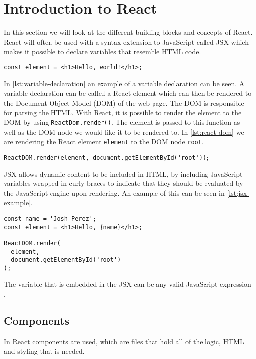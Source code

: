 \section{Introduction to React}\label{sec:intro-to-react}
In this section we will look at the different building blocks and concepts of React.
React will often be used with a syntax extension to JavaScript called JSX \cite{introducingJSX} which makes it possible to declare variables that resemble HTML code.

\begin{lstlisting}[caption={Variable declation in React}, captionpos=b, label={lst:variable-declaration}]
const element = <h1>Hello, world!</h1>;
\end{lstlisting}
In \autoref{lst:variable-declaration} an example of a variable declaration can be seen. 
A variable declaration can be called a React element which can then be rendered to the Document Object Model (DOM) of the web page.
The DOM is responsible for parsing the HTML.
With React, it is possible to render the element to the DOM by using \texttt{ReactDom.render()}.
The element is passed to this function as well as the DOM node we would like it to be rendered to.
In \autoref{lst:react-dom} we are rendering the React element \texttt{element} to the DOM node \texttt{root}.

\begin{lstlisting}[caption={ReactDOM example}, captionpos=b, label={lst:react-dom}]
ReactDOM.render(element, document.getElementById('root'));
\end{lstlisting}
JSX allows dynamic content to be included in HTML, by including JavaScript variables wrapped in curly braces to indicate that they should be evaluated by the JavaScript engine upon rendering.
An example of this can be seen in \autoref{lst:jsx-example}.
\begin{lstlisting}[caption={JSX example}, captionpos=b, label={lst:jsx-example}]
const name = 'Josh Perez';
const element = <h1>Hello, {name}</h1>;

ReactDOM.render(
  element,
  document.getElementById('root')
);
\end{lstlisting}
The variable that is embedded in the JSX can be any valid JavaScript expression \cite{introducingJSX}.

\subsection*{Components}
In React components are used, which are files that hold all of the logic, HTML and styling that is needed.

